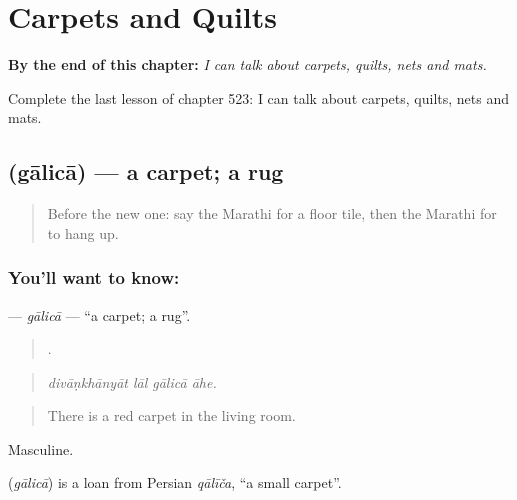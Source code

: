 
\chapter{Carpets and Quilts}
\label{ch:mr-carpets-and-quilts}

\begin{chapteropening}
\textbf{By the end of this chapter:} \emph{I can talk about carpets, quilts, nets and mats.}

Complete the last lesson of chapter 523: I can talk about carpets, quilts, nets and mats.
\end{chapteropening}

\section[\texorpdfstring{\mr{गालिचा} (gālicā)}{गालिचा (gālicā)}]{ (gālicā) — a carpet; a rug}

\label{lesson:MR-C523-galica}



\begin{quote}
Before the new one: say the Marathi for a floor tile, then the Marathi for to hang up.
\end{quote}

\subsection*{You'll want to know: }
\textbf{} — \emph{gālicā} — \textquotedblleft{}a carpet; a rug\textquotedblright{}.

\begin{quote}
   .
\end{quote}

\begin{quote}
\emph{divāṇkhānyāt lāl gālicā āhe.}
\end{quote}

\begin{quote}
There is a red carpet in the living room.
\end{quote}

Masculine.

\begin{cousinweb}
\textbf{} (\emph{gālicā}) is a loan from Persian \emph{qālīča}, \textquotedblleft{}a small carpet\textquotedblright{}.
\end{cousinweb}

